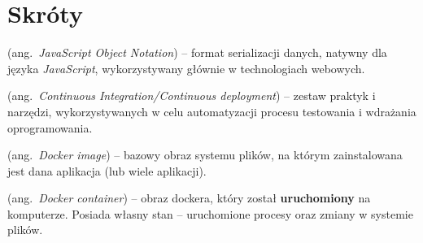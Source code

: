 \chapter*{Skróty}\mbox{}
\label{sec:skroty}
\noindent
\begin{description}[labelwidth=*]
  \item [JSON] (ang.\ \emph{JavaScript Object Notation}) %
      -- format serializacji danych, natywny dla języka \mbox{\textit{JavaScript}},
      wykorzystywany głównie w technologiach webowych.
  \item [CI/CD] (ang.\ \emph{Continuous Integration/Continuous deployment})
      -- zestaw praktyk i narzędzi, wykorzystywanych w celu automatyzacji procesu
      testowania i wdrażania oprogramowania.
  \item [Obraz dockera] (ang.\ \emph{Docker image}) -- bazowy obraz systemu plików,
        na którym zainstalowana jest dana aplikacja (lub wiele aplikacji).
  \item [Kontener dockera] (ang.\ \emph{Docker container}) -- obraz dockera,
        który został \textbf{uruchomiony} na komputerze. Posiada własny stan -- 
        uruchomione procesy oraz zmiany w systemie \mbox{plików}.
\end{description}
